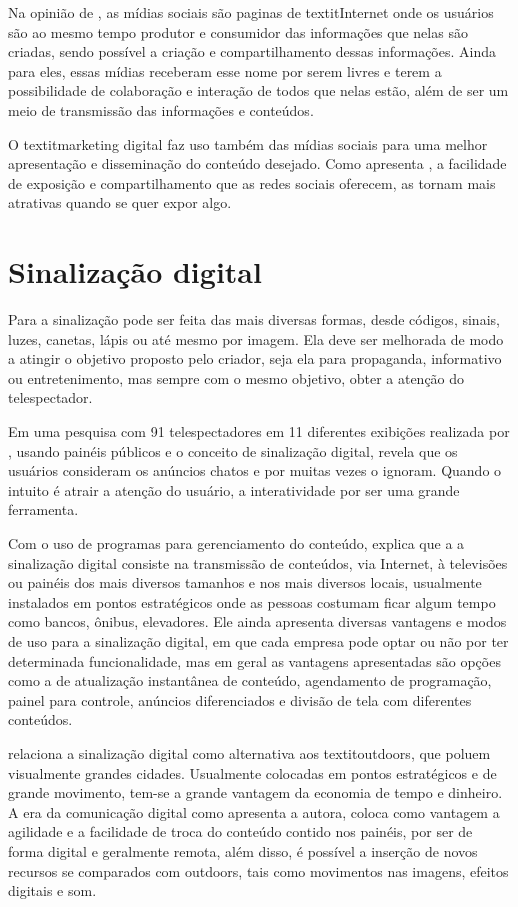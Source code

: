 Na opinião de \cite{torres2000}, as mídias sociais são paginas de textit{Internet} onde os usuários são ao mesmo tempo produtor e consumidor das informações que nelas são criadas, sendo possível a criação e compartilhamento dessas informações. Ainda para eles, essas mídias receberam esse nome por serem livres e terem a possibilidade de
colaboração e interação de todos que nelas estão, além de ser um meio de transmissão das informações e conteúdos.

O textit{marketing} digital faz uso também das mídias sociais para uma melhor apresentação e disseminação do conteúdo desejado. Como apresenta \cite{torres2000}, a facilidade de exposição e compartilhamento que as redes sociais oferecem, as tornam mais atrativas quando se quer expor algo.

\section{Sinalização digital}
Para \cite{munari2006} a sinalização pode ser feita das mais diversas formas, desde códigos, sinais, luzes, canetas, lápis ou até mesmo por imagem. Ela deve ser melhorada de modo a atingir o objetivo proposto pelo criador, seja ela para propaganda, informativo ou entretenimento, mas sempre com o mesmo objetivo, obter a atenção do telespectador.

Em uma pesquisa com 91 telespectadores em 11 diferentes exibições realizada por \cite{muller2009}, usando painéis públicos e o conceito de sinalização digital, revela que os usuários consideram os anúncios chatos e por muitas vezes o ignoram. Quando o intuito é atrair a atenção do usuário, a interatividade por ser uma grande ferramenta.

Com o uso de programas para gerenciamento do conteúdo, \cite[p.31]{machado2010} explica que a a sinalização digital consiste na transmissão de conteúdos, via Internet, à televisões ou painéis dos mais diversos tamanhos e nos mais diversos locais, usualmente instalados em pontos estratégicos onde as pessoas costumam ficar algum tempo como bancos, ônibus, elevadores. Ele ainda apresenta diversas vantagens e modos de uso para a sinalização digital, em que cada empresa pode optar ou não por ter determinada funcionalidade, mas em geral as vantagens apresentadas são opções como a de atualização instantânea de conteúdo, agendamento de programação, painel para controle, anúncios diferenciados e divisão de tela com diferentes conteúdos.

\cite[p.11]{cintra2010} relaciona a sinalização digital como alternativa aos textit{outdoors}, que poluem visualmente grandes cidades. Usualmente colocadas em pontos estratégicos e de grande movimento, tem-se a grande vantagem da economia de tempo e dinheiro. A era da comunicação digital como apresenta a autora, coloca como vantagem a agilidade e a facilidade de troca do conteúdo contido nos painéis, por ser de forma digital e geralmente remota, além disso, é possível a inserção de novos recursos se comparados com outdoors, tais como movimentos nas imagens, efeitos digitais e som.

